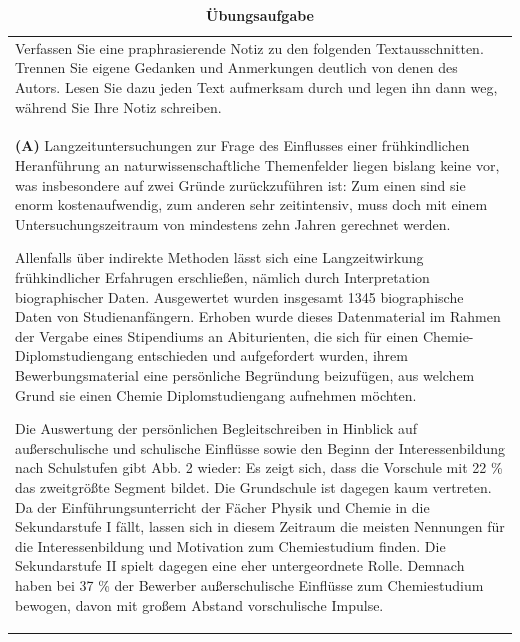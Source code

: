 \documentclass[]{book}
\theoremstyle{definition}
\theoremstyle{definition}
\theoremstyle{definition}
\theoremstyle{remark}
\begin{document}
\begin{longtable}[]{@{}l@{}}
\caption{\textbf{\label{tab:aufgabe5-test} Übungsaufgabe}}\tabularnewline
\toprule
\begin{minipage}[t]{0.97\columnwidth}\raggedright\strut
Verfassen Sie eine praphrasierende Notiz zu den folgenden
Textausschnitten. Trennen Sie eigene Gedanken und Anmerkungen deutlich
von denen des Autors. Lesen Sie dazu jeden Text aufmerksam durch und
legen ihn dann weg, während Sie Ihre Notiz schreiben.
\vspace{-6mm}\strut
\end{minipage}\tabularnewline
\begin{minipage}[t]{0.97\columnwidth}\raggedright\strut
\textbf{(A)} Langzeituntersuchungen zur Frage des Einflusses einer
frühkindlichen Heranführung an naturwissenschaftliche Themenfelder
liegen bislang keine vor, was insbesondere auf zwei Gründe
zurückzuführen ist: Zum einen sind sie enorm kostenaufwendig, zum
anderen sehr zeitintensiv, muss doch mit einem Untersuchungszeitraum von
mindestens zehn Jahren gerechnet werden.

Allenfalls über indirekte Methoden lässt sich eine Langzeitwirkung
frühkindlicher Erfahrugen erschließen, nämlich durch Interpretation
biographischer Daten. Ausgewertet wurden insgesamt 1345 biographische
Daten von Studienanfängern. Erhoben wurde dieses Datenmaterial im Rahmen
der Vergabe eines Stipendiums an Abiturienten, die sich für einen
Chemie-Diplomstudiengang entschieden und aufgefordert wurden, ihrem
Bewerbungsmaterial eine persönliche Begründung beizufügen, aus welchem
Grund sie einen Chemie Diplomstudiengang aufnehmen möchten.

Die Auswertung der persönlichen Begleitschreiben in Hinblick auf
außerschulische und schulische Einflüsse sowie den Beginn der
Interessenbildung nach Schulstufen gibt Abb. 2 wieder: Es zeigt sich,
dass die Vorschule mit 22 \% das zweitgrößte Segment bildet. Die
Grundschule ist dagegen kaum vertreten. Da der Einführungsunterricht der
Fächer Physik und Chemie in die Sekundarstufe I fällt, lassen sich in
diesem Zeitraum die meisten Nennungen für die Interessenbildung und
Motivation zum Chemiestudium finden. Die Sekundarstufe II spielt dagegen
eine eher untergeordnete Rolle. Demnach haben bei 37 \% der Bewerber
außerschulische Einflüsse zum Chemiestudium bewogen, davon mit großem
Abstand vorschulische Impulse.


\end{minipage}
\end{longtable}
\end{document}
